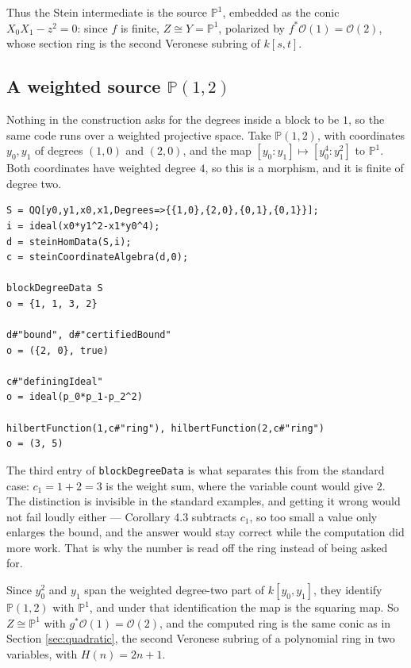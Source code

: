 \documentclass[11pt,reqno]{amsart}
\newcommand{\PP}{\ensuremath{\mathbb{P}}}
\newcommand{\sO}{\ensuremath{\mathcal{O}}}
\theoremstyle{plain}
\theoremstyle{definition}
\begin{document}
Thus the Stein intermediate is the source \(\PP^1\), embedded as the conic
\(X_0X_1-z^2=0\): since \(f\) is finite, \(Z\cong Y=\PP^1\), polarized by
\(f^*\sO(1)=\sO(2)\), whose section ring is the second Veronese subring of
\(k[s,t]\).

\subsection{\texorpdfstring{A weighted source \(\PP(1,2)\)}%
                           {A weighted source P(1,2)}}\label{sec:weighted}

Nothing in the construction asks for the degrees inside a block to be
\(1\), so the same code runs over a weighted projective space. Take
\(\PP(1,2)\), with coordinates \(y_0,y_1\) of degrees \((1,0)\) and
\((2,0)\), and the map \([y_0:y_1]\mapsto[y_0^4:y_1^2]\) to \(\PP^1\).
Both coordinates have weighted degree \(4\), so this is a morphism, and
it is finite of degree two.

\begin{verbatim}
S = QQ[y0,y1,x0,x1,Degrees=>{{1,0},{2,0},{0,1},{0,1}}];
i = ideal(x0*y1^2-x1*y0^4);
d = steinHomData(S,i);
c = steinCoordinateAlgebra(d,0);

blockDegreeData S
o = {1, 1, 3, 2}

d#"bound", d#"certifiedBound"
o = ({2, 0}, true)

c#"definingIdeal"
o = ideal(p_0*p_1-p_2^2)

hilbertFunction(1,c#"ring"), hilbertFunction(2,c#"ring")
o = (3, 5)
\end{verbatim}

The third entry of \texttt{blockDegreeData} is what separates this from
the standard case: \(c_1=1+2=3\) is the weight sum, where the variable
count would give \(2\). The distinction is invisible in the standard
examples, and getting it wrong would not fail loudly either --- Corollary
4.3 subtracts \(c_1\), so too small a value only enlarges the bound, and
the answer would stay correct while the computation did more work. That is
why the number is read off the ring instead of being asked for.

Since \(y_0^2\) and \(y_1\) span the weighted degree-two part of
\(k[y_0,y_1]\), they identify \(\PP(1,2)\) with \(\PP^1\), and under that
identification the map is the squaring map. So \(Z\cong\PP^1\) with
\(g^*\sO(1)=\sO(2)\), and the computed ring is the same conic as in
Section \ref{sec:quadratic}, the second Veronese subring of a polynomial
ring in two variables, with \(H(n)=2n+1\).
\end{document}
